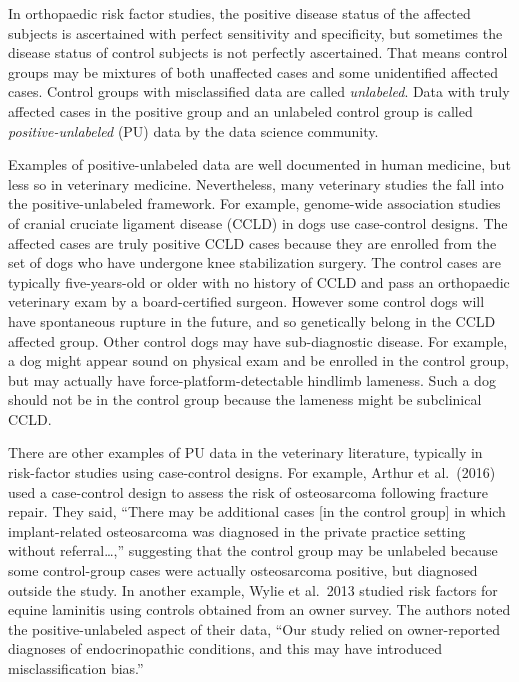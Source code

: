 \documentclass[
]{article}
\begin{document}
In orthopaedic risk factor studies, the positive disease status of the
affected subjects is ascertained with perfect sensitivity and
specificity, but sometimes the disease status of control subjects is not
perfectly ascertained. That means control groups may be mixtures of both
unaffected cases and some unidentified affected cases. Control groups
with misclassified data are called \emph{unlabeled}. Data with truly
affected cases in the positive group and an unlabeled control group is
called \emph{positive-unlabeled} (PU) data by the data science
community.

Examples of positive-unlabeled data are well documented in human
medicine, but less so in veterinary medicine. Nevertheless, many
veterinary studies the fall into the positive-unlabeled framework. For
example, genome-wide association studies of cranial cruciate ligament
disease (CCLD) in dogs use case-control designs. The affected cases are
truly positive CCLD cases because they are enrolled from the set of dogs
who have undergone knee stabilization surgery. The control cases are
typically five-years-old or older with no history of CCLD and pass an
orthopaedic veterinary exam by a board-certified surgeon. However some
control dogs will have spontaneous rupture in the future, and so
genetically belong in the CCLD affected group. Other control dogs may
have sub-diagnostic disease. For example, a dog might appear sound on
physical exam and be enrolled in the control group, but may actually
have force-platform-detectable hindlimb lameness. Such a dog should not
be in the control group because the lameness might be subclinical CCLD.
\cite{wrehim08}

There are other examples of PU data in the veterinary literature,
typically in risk-factor studies using case-control designs. For
example, Arthur et al.~(2016) used a case-control design to assess the
risk of osteosarcoma following fracture repair. \cite{aakj16} They said,
``There may be additional cases {[}in the control group{]} in which
implant-related osteosarcoma was diagnosed in the private practice
setting without referral\ldots,'' suggesting that the control group may
be unlabeled because some control-group cases were actually osteosarcoma
positive, but diagnosed outside the study. In another example, Wylie et
al.~2013 studied risk factors for equine laminitis using controls
obtained from an owner survey. \cite{wcvj13} The authors noted the
positive-unlabeled aspect of their data, ``Our study relied on
owner-reported diagnoses of endocrinopathic conditions, and this may
have introduced misclassification bias.''
\end{document}
